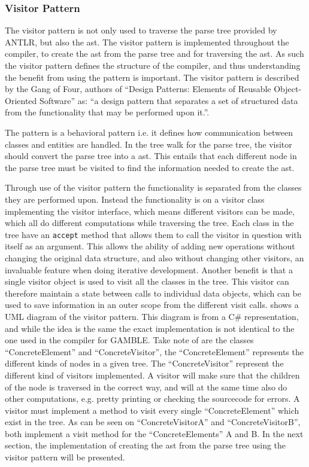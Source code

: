 \subsubsection*{Visitor Pattern}\label{subs:visit}
The visitor pattern is not only used to traverse the parse tree provided by ANTLR, but also the \acrfull{ast}.
The visitor pattern is implemented throughout the compiler, to create the \acrshort{ast} from the parse tree and for traversing the \acrshort{ast}.
As such the visitor pattern defines the structure of the compiler, and thus understanding the benefit from using the pattern is important.
The visitor pattern is described by the Gang of Four, authors of ``Design Patterns: Elements of Reusable Object-Oriented Software'' as:
``a design pattern that separates a set of structured data from the functionality that may be performed upon it.''. \citep{GOF}

The pattern is a behavioral pattern i.e. it defines how communication between classes and entities are handled.
In the tree walk for the parse tree, the visitor should convert the parse tree into a \acrshort{ast}.
This entails that each different node in the parse tree must be visited to find the information needed to create the \acrshort{ast}.

Through use of the visitor pattern the functionality is separated from the classes they are performed upon. 
Instead the functionality is on a visitor class implementing the visitor interface, which means different visitors can be made, which all do different computations while traversing the tree.
Each class in the tree have an \texttt{accept} method that allows them to call the visitor in question with itself as an argument.
This allows the ability of adding new operations without changing the original data structure, and also without changing other visitors, an invaluable feature when doing iterative development.
Another benefit is that a single visitor object is used to visit all the classes in the tree.
This visitor can therefore maintain a state between calls to individual data objects, which can be used to save information in an outer scope from the different visit calls.
 shows a UML diagram of the visitor pattern.
This diagram is from a C\# representation, and while the idea is the same the exact implementation is not identical to the one used in the compiler for GAMBLE.
Take note of are the classes ``ConcreteElement'' and ``ConcreteVisitor'', the ``ConcreteElement'' represents the different kinds of nodes in a given tree.
The ``ConcreteVisitor'' represent the different kind of visitors implemented.
A visitor will make sure that the children of the node is traversed in the correct way, and will at the same time also do other computations, e.g. pretty printing or checking the sourcecode for errors.
A visitor must implement a method to visit every single ``ConcreteElement'' which exist in the tree.
As can be seen on  ``ConcreteVisitorA'' and ``ConcreteVisitorB'', both implement a visit method for the ``ConcreteElements'' A and B.
In the next section, the implementation of creating the \acrshort{ast} from the parse tree using the visitor pattern will be presented.

